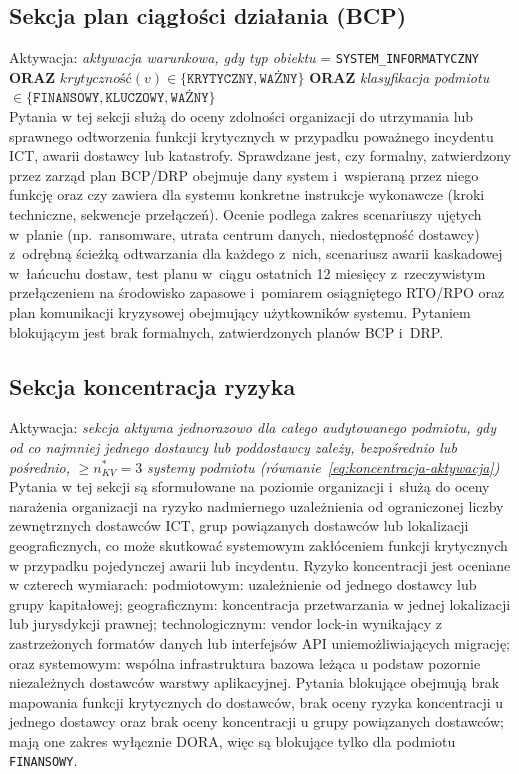 \subsection{Sekcja plan ciągłości działania (BCP)}
\noindent Aktywacja: \textit{aktywacja warunkowa, gdy typ obiektu} = \texttt{SYSTEM\_INFORMATYCZNY} \textbf{ORAZ} $\textit{krytyczność}(v) \in \{\texttt{KRYTYCZNY}, \texttt{WAŻNY}\}$ \textbf{ORAZ} \textit{klasyfikacja podmiotu} $\in \{\texttt{FINANSOWY}, \texttt{KLUCZOWY}, \texttt{WAŻNY}\}$\\
Pytania w tej sekcji służą do oceny zdolności organizacji do utrzymania lub sprawnego odtworzenia funkcji krytycznych w przypadku poważnego incydentu ICT, awarii dostawcy lub katastrofy. Sprawdzane jest, czy formalny, zatwierdzony przez zarząd plan BCP/DRP obejmuje dany system i~wspieraną przez niego funkcję oraz czy zawiera dla systemu konkretne instrukcje wykonawcze (kroki techniczne, sekwencje przełączeń). Ocenie podlega zakres scenariuszy ujętych w~planie (np.\ ransomware, utrata centrum danych, niedostępność dostawcy) z~odrębną ścieżką odtwarzania dla każdego z~nich, scenariusz awarii kaskadowej w~łańcuchu dostaw, test planu w~ciągu ostatnich 12 miesięcy z~rzeczywistym przełączeniem na środowisko zapasowe i~pomiarem osiągniętego RTO/RPO oraz plan komunikacji kryzysowej obejmujący użytkowników systemu. Pytaniem blokującym jest brak formalnych, zatwierdzonych planów BCP i~DRP.

\subsection{Sekcja koncentracja ryzyka}
\noindent Aktywacja: \textit{sekcja aktywna jednorazowo dla całego audytowanego podmiotu, gdy od co najmniej jednego dostawcy lub poddostawcy zależy, bezpośrednio lub pośrednio,} $\geq n_{KV}^{*} = 3$ \textit{systemy podmiotu (równanie~\eqref{eq:koncentracja-aktywacja})}\\
Pytania w tej sekcji są sformułowane na poziomie organizacji i~służą do oceny narażenia organizacji na ryzyko nadmiernego uzależnienia od ograniczonej liczby zewnętrznych dostawców ICT, grup powiązanych dostawców lub lokalizacji geograficznych, co może skutkować systemowym zakłóceniem funkcji krytycznych w przypadku pojedynczej awarii lub incydentu. Ryzyko koncentracji jest oceniane w czterech wymiarach: podmiotowym: uzależnienie od jednego dostawcy lub grupy kapitałowej; geograficznym: koncentracja przetwarzania w jednej lokalizacji lub jurysdykcji prawnej; technologicznym:  vendor lock-in wynikający z zastrzeżonych formatów danych lub interfejsów API uniemożliwiających migrację; oraz systemowym:  wspólna infrastruktura bazowa leżąca u podstaw pozornie niezależnych dostawców warstwy aplikacyjnej. Pytania blokujące obejmują brak mapowania funkcji krytycznych do dostawców, brak oceny ryzyka koncentracji u jednego dostawcy oraz brak oceny koncentracji u grupy powiązanych dostawców; mają one zakres wyłącznie DORA, więc są blokujące tylko dla podmiotu \texttt{FINANSOWY}.

